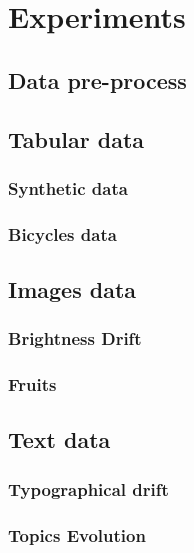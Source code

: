 \chapter{Experiments}\label{ch:experiments}

\section{Data pre-process}\label{sec:preprocess}

\section{Tabular data}\label{sec:tabular_data}

\subsection{Synthetic data}\label{subsec:sythetic_data}

\subsection{Bicycles data}\label{subsec:bicycles_data}

\section{Images data}\label{sec:images_data}

\subsection{Brightness Drift}\label{subsec:contrast_drift}

\subsection{Fruits}\label{subsec:fruits}

\section{Text data}\label{sec:text_data}

\subsection{Typographical drift}\label{subsec:typographical_drift}

\subsection{Topics Evolution}\label{subsec:topics_evolution}